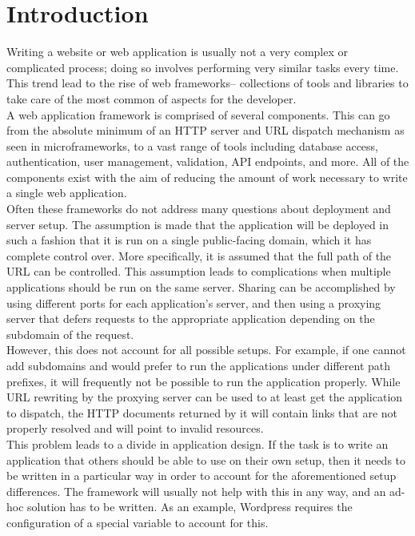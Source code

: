 \documentclass{sig-alternate}
\begin{document}
\printccsdesc


\section{Introduction}
Writing a website or web application is usually not a very complex or complicated process; doing so involves performing very similar tasks every time. This trend lead to the rise of web frameworks-- collections of tools and libraries to take care of the most common of aspects for the developer. \\

A web application framework is comprised of several components. This can go from the absolute minimum of an HTTP server and URL dispatch mechanism as seen in microframeworks\cite{microframeworks}, to a vast range of tools including database access, authentication, user management, validation, API endpoints, and more. All of the components exist with the aim of reducing the amount of work necessary to write a single web application. \\

Often these frameworks do not address many questions about deployment and server setup. The assumption is made that the application will be deployed in such a fashion that it is run on a single public-facing domain, which it has complete control over. More specifically, it is assumed that the full path of the URL can be controlled. This assumption leads to complications when multiple applications should be run on the same server. Sharing can be accomplished by using different ports for each application's server, and then using a proxying server that defers requests to the appropriate application depending on the subdomain of the request. \\

However, this does not account for all possible setups. For example, if one cannot add subdomains and would prefer to run the applications under different path prefixes, it will frequently not be possible to run the application properly. While URL rewriting by the proxying server can be used to at least get the application to dispatch, the HTTP documents returned by it will contain links that are not properly resolved and will point to invalid resources. \\

This problem leads to a divide in application design. If the task is to write an application that others should be able to use on their own setup, then it needs to be written in a particular way in order to account for the aforementioned setup differences. The framework will usually not help with this in any way, and an ad-hoc solution has to be written. As an example, Wordpress requires the configuration of a special variable to account for this.\cite{wordpress} \\
\end{document}
